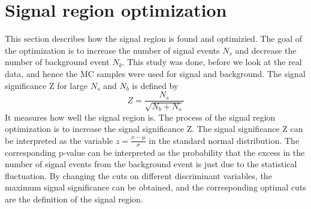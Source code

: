 \section{Signal region optimization}
This section describes how the signal region is found and optimizied.
The goal of the optimization is to increase the number of signal events $N_s$ and decrease the number of background event $N_b$.
This study was done, before we look at the real data, and hence the MC samples were used for signal and background.
The signal significance Z for large $N_s$ and $N_b$ is defined by
\begin{equation}
Z = \frac{N_s}{\sqrt{N_b + N_s}}
\label{equ:simple_significance}
\end{equation}
It measures how well the signal region is.
The process of the signal region optimization is to increase the signal significance Z.
The signal significance Z can be interpreted as the variable $z = \frac{x-\mu}{\sigma}$ in the standard normal distribution.
The corresponding p-value can be interpreted as the probability that the excess in the number of signal events from the background event is just due to the statistical fluctuation.
By changing the cuts on different discriminant variables, the maximum signal significance can be obtained, and the corresponding optimal cuts are the definition of the signal region.

